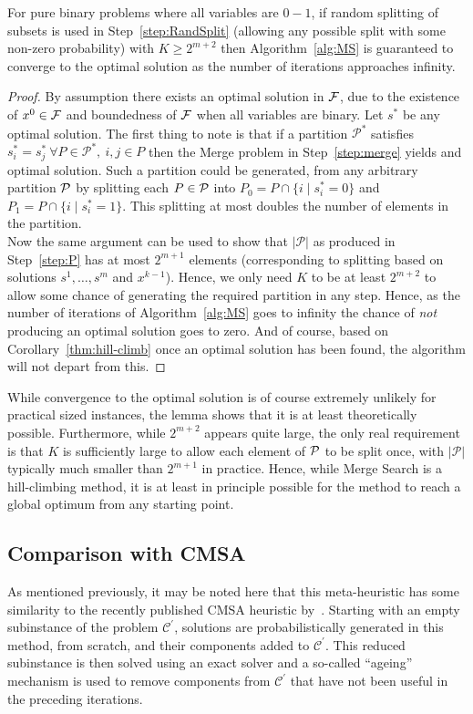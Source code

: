 \documentclass[journal]{IEEEtran}
\begin{document}
\begin{lemma}\label{thm:optimal}
  For pure binary problems where all variables are $0-1$, if random splitting of subsets is used in Step~\ref{step:RandSplit} (allowing any possible split with some non-zero probability) with $K\ge 2^{m+2}$ then Algorithm~\ref{alg:MS} is guaranteed to converge to the optimal solution as the number of iterations approaches infinity. 
\end{lemma}
\begin{proof}
  By assumption there exists an optimal solution in $\cal F$, due to the existence of $x^0\in\cal F$ and boundedness of $\cal F$ when all variables are binary. Let $s^*$ be any optimal solution. The first thing to note is that if a partition $\mathcal{P}^*$ satisfies $s^*_i=s^*_j\ \forall P\in \mathcal{P}^*,\ i,j\in P$ then the Merge problem in Step~\ref{step:merge} yields and optimal solution. 
  Such a partition could be generated, from any arbitrary partition $\cal P$ by splitting each $P\in\cal P$ into $P_0=P\cap \{i\mid s^*_i=0\}$ and $P_1=P\cap \{i\mid s^*_i=1\}$. This splitting at most doubles the number of elements in the partition. \\
  Now the same argument can be used to show that $|\mathcal{P}|$ as produced in Step~\ref{step:P} has at most $2^{m+1}$ elements (corresponding to splitting based on solutions $s^1,\ldots,s^m$ and $x^{k-1}$). Hence, we only need $K$ to be at least $2^{m+2}$ to allow some chance of generating the required partition in any step. Hence, as the number of iterations of Algorithm~\ref{alg:MS} goes to infinity the chance of \emph{not} producing an optimal solution goes to zero. And of course, based on Corollary~\ref{thm:hill-climb} once an optimal solution has been found, the algorithm will not depart from this.
\end{proof}
While convergence to the optimal solution is of course extremely unlikely for practical sized instances, the lemma shows that it is at least theoretically possible. Furthermore, while $2^{m+2}$ appears quite large, the only real requirement is that $K$ is sufficiently large to allow each element of $\cal P$ to be split once, with $|\mathcal{P}|$ typically much smaller than $2^{m+1}$ in practice. Hence, while Merge Search is a hill-climbing method, it is at least in principle possible for the method to reach a global optimum from any starting point.


\subsection{Comparison with CMSA}
As mentioned previously, it may be noted here that this meta-heuristic has some similarity to the
recently published CMSA heuristic by~\cite{Blum2016}. Starting with an empty subinstance of the problem $\mathcal{C}^\prime$, solutions are probabilistically generated in this method, from scratch, and their components added to $\mathcal{C}^\prime$. This reduced subinstance is then solved using an exact solver and a so-called ``ageing'' mechanism is used to remove components from $\mathcal{C}^\prime$ that have not been useful in the preceding iterations. 
\end{document}
